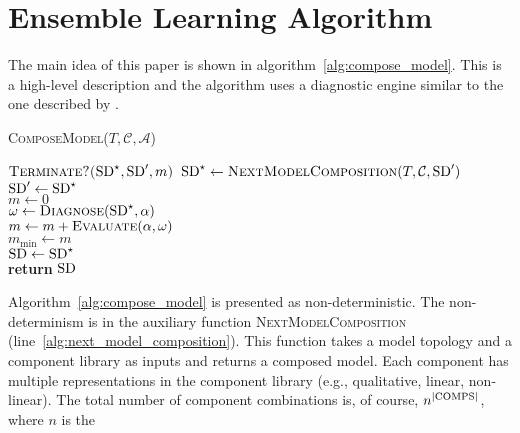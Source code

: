 \section{Ensemble Learning Algorithm}
%
The main idea of this paper is shown in
algorithm~\ref{alg:compose_model}. This is a high-level description
and the algorithm uses a diagnostic engine similar to the one
described by \cite{feldman13genius}.
%
\begin{algorithm}[htb]
\begin{footnotesize}
%
\caption{\textsc{ComposeModel}($T, \mathcal{C}, \mathcal{A}$)}
\label{alg:compose_model}
%
%
%
\vspace{0.075in}
%
\Repeat
{
$\textsc{Terminate?($\mathrm{SD}^\star, \mathrm{SD}^\prime, m$)}$
}
{
    $\mathrm{SD}^\star \gets \textsc{NextModelComposition}(T, \mathcal{C}, \mathrm{SD}^\prime)$\label{alg:next_model_composition}\\
    $\mathrm{SD}^\prime \gets \mathrm{SD}^\star$\\
    $m \gets 0$\\
    {
        $\omega \gets \textsc{Diagnose}(\mathrm{SD}^\star, \alpha)$\\
        $m \gets m + \textsc{Evaluate}(\alpha, \omega)$\label{alg:evaluate}\\
    }
    {
        $m_{\min} \gets m$\\
        $\mathrm{SD} \gets \mathrm{SD}^\star$\label{alg:accept_end}\\
    }
}
\textbf{return} $\mathrm{SD}$
%
\end{footnotesize}
\end{algorithm}
%
\par
%
Algorithm~\ref{alg:compose_model} is presented as
non-deterministic. The non-determinism is in the auxiliary function
\textsc{NextModelComposition}
(line~\ref{alg:next_model_composition}). This function takes a model
topology and a component library as inputs and returns a composed
model. Each component has multiple representations in the component
library (e.g., qualitative, linear, non-linear). The total number of
component combinations is, of course, $n^{|\mathrm{COMPS}|}$, where $n$ is the
